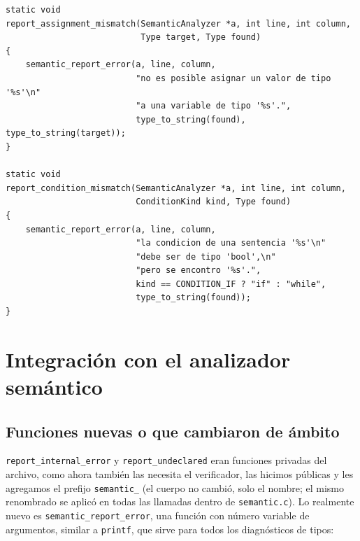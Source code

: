 \documentclass[12pt,letterpaper]{article}
\begin{document}
\begin{lstlisting}[style=modernc, caption={\texttt{type\_checker.c}: diagnósticos.}]
static void
report_assignment_mismatch(SemanticAnalyzer *a, int line, int column,
                           Type target, Type found)
{
    semantic_report_error(a, line, column,
                          "no es posible asignar un valor de tipo '%s'\n"
                          "a una variable de tipo '%s'.",
                          type_to_string(found), type_to_string(target));
}

static void
report_condition_mismatch(SemanticAnalyzer *a, int line, int column,
                          ConditionKind kind, Type found)
{
    semantic_report_error(a, line, column,
                          "la condicion de una sentencia '%s'\n"
                          "debe ser de tipo 'bool',\n"
                          "pero se encontro '%s'.",
                          kind == CONDITION_IF ? "if" : "while",
                          type_to_string(found));
}
\end{lstlisting}

\section*{Integración con el analizador semántico}

\subsection*{Funciones nuevas o que cambiaron de ámbito}

\texttt{report\_internal\_error} y \texttt{report\_undeclared} eran funciones privadas del archivo, como ahora
también las necesita el verificador, las hicimos públicas y les agregamos el prefijo \texttt{semantic\_} (el
cuerpo no cambió, solo el nombre; el mismo renombrado se aplicó en todas las llamadas dentro de
\texttt{semantic.c}). Lo realmente nuevo es \texttt{semantic\_report\_error}, una función con número variable
de argumentos, similar a \texttt{printf}, que sirve para todos los diagnósticos de tipos:
\end{document}

